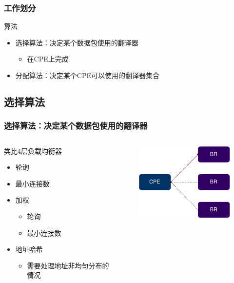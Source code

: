 \documentclass{beamer}
\begin{document}
\begin{frame}
  \frametitle{工作划分}
  \begin{block}{算法}
    \begin{itemize}
    \item 选择算法：决定某个数据包使用的翻译器
      \begin{itemize}
      \item 在CPE上完成
      \end{itemize}
    \item 分配算法：决定某个CPE可以使用的翻译器集合
    \end{itemize}
  \end{block}
\end{frame}

\subsection{选择算法}

\begin{frame}
  \frametitle{选择算法：决定某个数据包使用的翻译器}
  \begin{columns}
    \begin{block}{类比4层负载均衡器}
      \begin{itemize}
      \item 轮询
      \item 最小连接数
      \item 加权
        \begin{itemize}
        \item 轮询
        \item 最小连接数
        \end{itemize}
      \item 地址哈希
        \begin{itemize}
        \item 需要处理地址非均匀分布的情况
        \end{itemize}
      \end{itemize}
    \end{block}
    \begin{figure}[ht]
    \begin{center}
      \includegraphics[width=15em]{figs/BR-selection.pdf}  
    \end{center}
    \end{figure}
  \end{columns}
\end{frame}
\end{document}
